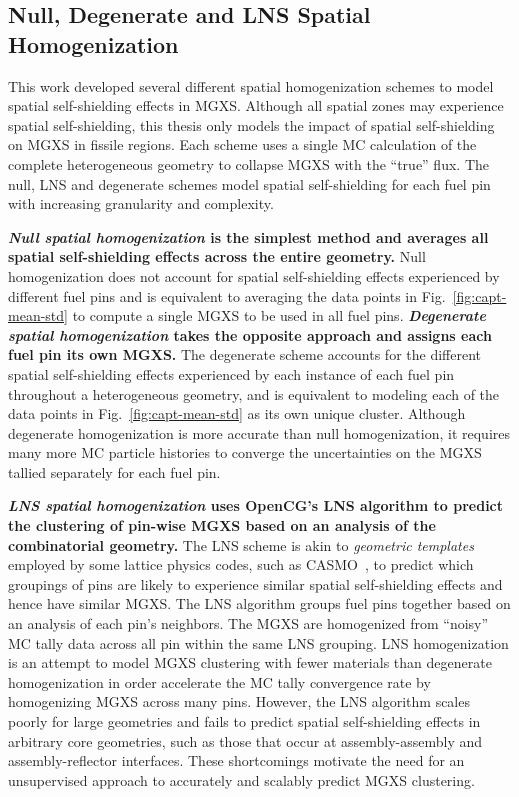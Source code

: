 \documentclass[12pt,twoside]{mitthesis-exec}
\begin{document}
\subsection*{Null, Degenerate and LNS Spatial Homogenization}

This work developed several different spatial homogenization schemes to model spatial self-shielding effects in MGXS. Although all spatial zones may experience spatial self-shielding, this thesis only models the impact of spatial self-shielding on MGXS in fissile regions. Each scheme uses a single MC calculation of the complete heterogeneous geometry to collapse MGXS with the ``true'' flux. The null, LNS and degenerate schemes model spatial self-shielding for each fuel pin with increasing granularity and complexity.

\textbf{\textit{Null spatial homogenization} is the simplest method and averages all spatial self-shielding effects across the entire geometry.} Null homogenization does not account for spatial self-shielding effects experienced by different fuel pins and is equivalent to averaging the data points in Fig.~\ref{fig:capt-mean-std} to compute a single MGXS to be used in all fuel pins. \textbf{\textit{Degenerate spatial homogenization} takes the opposite approach and assigns each fuel pin its own MGXS.} The degenerate scheme accounts for the different spatial self-shielding effects experienced by each instance of each fuel pin throughout a heterogeneous geometry, and is equivalent to modeling each of the data points in Fig.~\ref{fig:capt-mean-std} as its own unique cluster. Although degenerate homogenization is more accurate than null homogenization, it requires many more MC particle histories to converge the uncertainties on the MGXS tallied separately for each fuel pin.

\textbf{\textit{LNS spatial homogenization} uses OpenCG's LNS algorithm to predict the clustering of pin-wise MGXS based on an analysis of the combinatorial geometry.} The LNS scheme is akin to \textit{geometric templates} employed by some lattice physics codes, such as CASMO~\cite{rhodes2006casmo}, to predict which groupings of pins are likely to experience similar spatial self-shielding effects and hence have similar MGXS. The LNS algorithm groups fuel pins together based on an analysis of each pin's neighbors. The MGXS are homogenized from ``noisy'' MC tally data across all pin within the same LNS grouping. LNS homogenization is an attempt to model MGXS clustering with fewer materials than degenerate homogenization in order accelerate the MC tally convergence rate by homogenizing MGXS across many pins. However, the LNS algorithm scales poorly for large geometries and fails to predict spatial self-shielding effects in arbitrary core geometries, such as those that occur at assembly-assembly and assembly-reflector interfaces. These shortcomings motivate the need for an unsupervised approach to accurately and scalably predict MGXS clustering.
\end{document}
